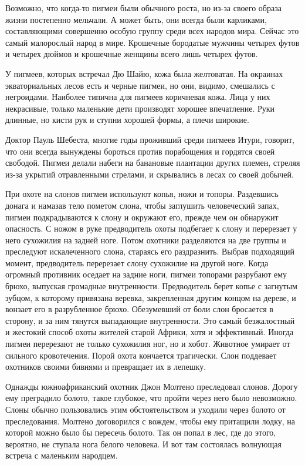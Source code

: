 \documentclass[12pt,a4paper,twoside,openany,svgnames]{memoir}
\begin{document}
Возможно, что когда-то пигмеи были обычного роста, но из-за своего образа жизни постепенно мельчали. А может быть, они всегда были карликами, составляющими совершенно особую группу среди всех народов мира. Сейчас это самый малорослый народ в мире. Крошечные бородатые мужчины четырех футов и четырех дюймов и крошечные женщины всего лишь четырех футов.

У пигмеев, которых встречал Дю Шайю, кожа была желтоватая. На окраинах экваториальных лесов есть и черные пигмеи, но они, видимо, смешались с негроидами. Наиболее типична для пигмеев коричневая кожа. Лица у них некрасивые, только маленькие дети производят хорошее впечатление. Руки длинные, но кисти рук и ступни хорошей формы, а плечи широкие.

Доктор Пауль Шебеста, многие годы проживший среди пигмеев Итури, говорит, что они всегда вынуждены бороться против порабощения и гордятся своей свободой. Пигмеи делали набеги на банановые плантации других племен, стреляя из-за укрытий отравленными стрелами, и скрывались в лесах со своей добычей.

При охоте на слонов пигмеи используют копья, ножи и топоры. Раздевшись донага и намазав тело пометом слона, чтобы заглушить человеческий запах, пигмеи подкрадываются к слону и окружают его, прежде чем он обнаружит опасность. С ножом в руке предводитель охоты подбегает к слону и перерезает у него сухожилия на задней ноге. Потом охотники разделяются на две группы и преследуют искалеченного слона, стараясь его раздразнить. Выбрав подходящий момент, предводитель перерезает слону сухожилие на другой ноге. Когда огромный противник оседает на задние ноги, пигмеи топорами разрубают ему брюхо, выпуская громадные внутренности. Предводитель берет копье с загнутым зубцом, к которому привязана веревка, закрепленная другим концом на дереве, и вонзает его в разрубленное брюхо. Обезумевший от боли слон бросается в сторону, и за ним тянутся выпадающие внутренности. Это самый безжалостный и жестокий способ охоты жителей старой Африки, хотя и эффективный. Иногда пигмеи перерезают не только сухожилия ног, но и хобот. Животное умирает от сильного кровотечения. Порой охота кончается трагически. Слон поддевает охотников своими бивнями и превращает их в лепешку.

Однажды южноафриканский охотник Джон Молтено преследовал слонов. Дорогу ему преградило болото, такое глубокое, что пройти через него было невозможно. Слоны обычно пользовались этим обстоятельством и уходили через болото от преследования. Молтено договорился с вождем, чтобы ему притащили лодку, на которой можно было бы пересечь болото. Так он попал в лес, где до этого, вероятно, не ступала нога белого человека. И вот там состоялась волнующая встреча с маленьким народцем.
\end{document}
